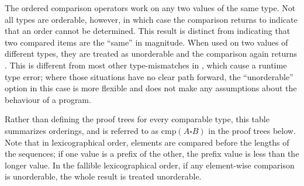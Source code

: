 \begin{prooftree}
\end{prooftree}

\begin{prooftree}
\end{prooftree}

The ordered comparison operators work on any two values of the same type. Not
all types are orderable, however, in which case the comparison returns 
to indicate that an order cannot be determined. This  result is distinct
from indicating that two compared items are the ``same'' in magnitude. When used
on two values of different types, they are treated as unorderable and the comparison
again returns . This is different from most other type-mismatches in \Trilogy{},
which cause a runtime type error; where those situations have no clear path forward,
the ``unorderable'' option in this case is more flexible and does not make any
assumptions about the behaviour of a program.

Rather than defining the proof trees for every comparable type, this table summarizes
orderings, and is referred to as $\text{cmp}(A \square B)$ in the proof trees below. Note
that in lexicographical order, elements are compared before the lengths of the sequences;
if one value is a prefix of the other, the prefix value is less than the longer value.
In the fallible lexicographical order, if any element-wise comparison is unorderable, the
whole result is treated unorderable.

